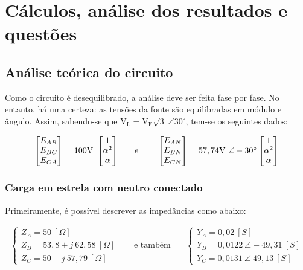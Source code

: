 \documentclass[a4paper,12pt,oneside,openany,table,xcdraw]{article}
\begin{document}
\section{Cálculos, análise dos resultados e questões} %

\subsection{Análise teórica do circuito}
Como o circuito é desequilibrado, a análise deve ser feita fase por fase. No entanto, há uma certeza: as tensões da fonte são equilibradas em módulo e ângulo. Assim, sabendo-se que $\mathrm{V_{L} =V_{F}\sqrt{3} \ \angle 30^{\circ }}$, tem-se os seguintes dados:

\vspace{-0.4cm}
\begin{equation*}
\begin{array}{ c c c }
\mathrm{\begin{bmatrix}
E_{AB}\\
E_{BC}\\
E_{CA}
\end{bmatrix} =100V\ \begin{bmatrix}
1\\
\alpha ^{2}\\
\alpha 
\end{bmatrix}} & \quad \text{e} \quad \  & \mathrm{\begin{bmatrix}
E_{AN}\\
E_{BN}\\
E_{CN}
\end{bmatrix} =57,74V\ \angle -30^{\circ } \begin{bmatrix}
1\\
\alpha ^{2}\\
\alpha 
\end{bmatrix}}
\end{array}
\end{equation*}

\vspace{0.2cm}
\subsubsection{Carga em estrela com neutro conectado} \label{m1:teoria}
Primeiramente, é possível descrever as impedâncias como abaixo:

\vspace{-0.5cm}
\begin{equation*}
\begin{aligned}
\begin{cases}
Z_{A} =50\ [ \Omega ]\\
Z_{B} =53,8+j\ 62,58\ [ \Omega ]\\
Z_{C} =50-j\ 57,79\ [ \Omega ]
\end{cases} & \quad \text{e também} \quad  & \begin{cases}
Y_{A} =0,02\ [ S]\\
Y_{B} =0,0122\ \angle -49,31\ [ S]\\
Y_{C} =0,0131\ \angle \ 49,13\ [ S]
\end{cases}
\end{aligned}
\end{equation*}
\end{document}
